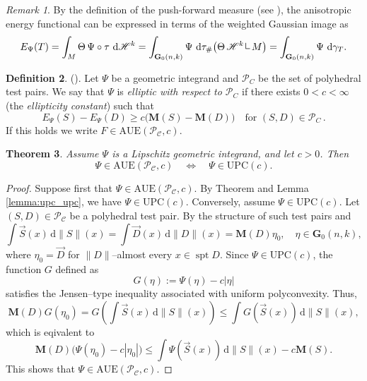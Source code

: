\documentclass[a4paper,twoside,reqno]{article}
\theoremstyle{definition}
\theoremstyle{remark}
\theoremstyle{plain}
\newtheorem{theorem}{Theorem}[section]
\theoremstyle{remark}
\newtheorem{remark}[theorem]{Remark}
\theoremstyle{definition}
\newtheorem{definition}[theorem]{Definition}
\newcommand{\ograss}[2]{\mathbf{G}_0(#1,#2)}
\newcommand{\Mass}{\mathbf{M}}
\newcommand{\UPC}{\mathrm{UPC}}
\newcommand{\AUE}{\mathrm{AUE}}
\newcommand{\HM}{\mathscr{H}}
\newcommand{\restrict}{ \mathop{ \rule[1pt]{.5pt}{6pt} \rule[1pt]{4pt}{0.5pt} }\nolimits }
\newcommand{\ud}{\ensuremath{\,\mathrm{d}}}
\DeclareMathOperator{\spt}{spt}
\begin{document}
\begin{remark}
    By the definition of the push-forward measure (see \cite[2.1.2]{Federer1969}),
    the anisotropic energy functional can be expressed in terms of the weighted
    Gaussian image as
    \[
        E_{\Psi}(T)
        = \int_M \Theta\,\Psi\circ\tau \,\ud\HM^k
        = \int_{\ograss{n}{k}} \Psi \,\ud \tau_{\#}
        \bigl(\Theta\,\HM^k \restrict M\bigr)
        = \int_{\ograss{n}{k}} \Psi \,\ud \gamma_T .
    \]
\end{remark}

\begin{definition}\label{def:polyhedral_ellipticity}
    (\cite[5.3]{Lesniak_2025}).
    Let $\Psi$ be a geometric integrand and $\mathcal{P}_C$ be the set of 
    polyhedral test pairs. We say that $\Psi$ is \emph{elliptic with respect to 
    $\mathcal{P}_C$} if there exists $0 < c < \infty$ (the \emph{ellipticity 
    constant}) such that
    \[
        E_{\Psi}(S) - E_{\Psi}(D) \geq c \bigl( \Mass(S) - \Mass(D) \bigr)
        \quad \text{for $(S,D) \in \mathcal{P}_C$} \,.
    \]
    If this holds we write $F \in \AUE(\mathcal{P_C}, c)$.
\end{definition}

\begin{theorem}\label{thm:main1}
    Assume $\Psi$ is a Lipschitz geometric integrand, and let $c > 0$. Then
    \[
        \Psi \in \AUE(\mathcal{P_C}, c)
        \quad \Longleftrightarrow \quad
        \Psi \in \UPC(c).
    \]
\end{theorem}

\begin{proof}
    Suppose first that $\Psi \in \AUE(\mathcal{P_C}, c)$. 
    By Theorem \cite[5.10]{Lesniak_2025} and Lemma \ref{lemma:upc_upc}, we have
    $\Psi \in \UPC(c)$. Conversely, assume $\Psi \in \UPC(c)$. 
    Let $(S, D) \in \mathcal{P_C}$ be a polyhedral test pair. By the structure of 
    such test pairs and \cite[5.1.2]{Federer1969}
    \[
        \int \vec{S}(x)\ud\|S\|(x) = \int \vec{D}(x)\ud\|D\|(x) = \Mass(D)\eta_0,
        \quad \eta \in \ograss{n}{k},
    \]
    where $\eta_0 = \vec{D}$ for $\|D\|$--almost every $x\in\spt D$. Since 
    $\Psi \in \UPC(c)$, the function $G$ defined as
    \[
        G(\eta) := \Psi(\eta) - c|\eta|
    \]
    satisfies the Jensen--type inequality associated with uniform polyconvexity.
    Thus,
    \[
        \Mass(D) G(\eta_0) = G(\int \vec{S}(x)\ud\|S\|(x)) 
        \leq \int G(\vec{S}(x))\ud\|S\|(x),
    \]
    which is eqivalent to
    \[
        \Mass(D)\big( \Psi(\eta_0) - c|\eta_0| \big)
        \leq \int \Psi(\vec{S}(x))\ud\|S\|(x) - c\Mass(S).
    \]
    This shows that $\Psi \in \AUE(\mathcal{P_C}, c)$.
\end{proof}
\end{document}
